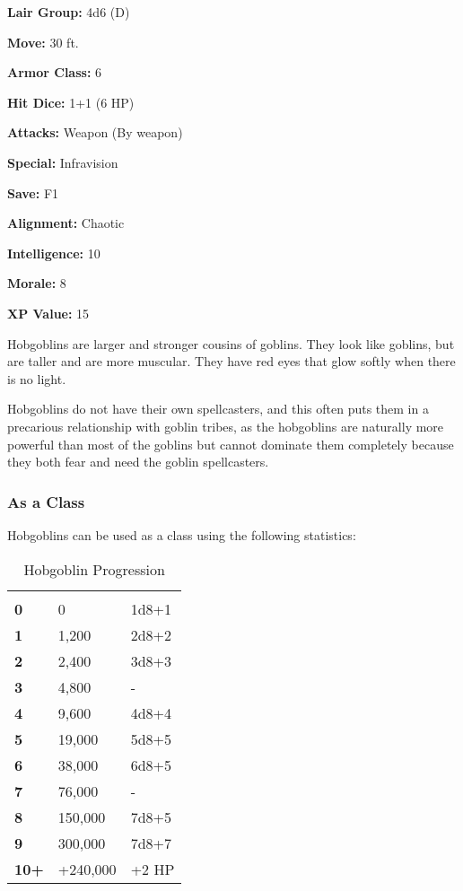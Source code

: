 \begin{multicols*}{2}
{\textbf{Lair Group:} 4d6 (D)

\textbf{Move:} 30 ft.

\textbf{Armor Class:} 6

\textbf{Hit Dice:} 1+1 (6 HP)

\textbf{Attacks:} Weapon (By weapon)

\textbf{Special:} Infravision

\textbf{Save:} F1

\textbf{Alignment:} Chaotic

\textbf{Intelligence:} 10

\textbf{Morale:} 8

\textbf{XP Value:} 15}

Hobgoblins are larger and stronger cousins of goblins. They look like goblins, but are taller and are more muscular. They have red eyes that glow softly when there is no light.

Hobgoblins do not have their own spellcasters, and this often puts them in a precarious relationship with goblin tribes, as the hobgoblins are naturally more powerful than most of the goblins but cannot dominate them completely because they both fear and need the goblin spellcasters.

\subsubsection{As a Class}
Hobgoblins can be used as a class using the following statistics:


\begin {table}[H]
  \caption{Hobgoblin Progression}
  \begin{tabularx}{\columnwidth}{>{\bfseries}YYY}
	 &  & \\
	0 & 0 & 1d8+1\\
	1 & 1,200 & 2d8+2\\
	2 & 2,400 & 3d8+3\\
	3 & 4,800 & -\\
	4 & 9,600 & 4d8+4\\
	5 & 19,000 & 5d8+5\\
	6 & 38,000 & 6d8+5\\
	7 & 76,000 & -\\
	8 & 150,000 & 7d8+5\\
	9 & 300,000 & 7d8+7\\
	10+ & +240,000 & +2 HP
  \end {tabularx}
\end {table}


\end{multicols*}
